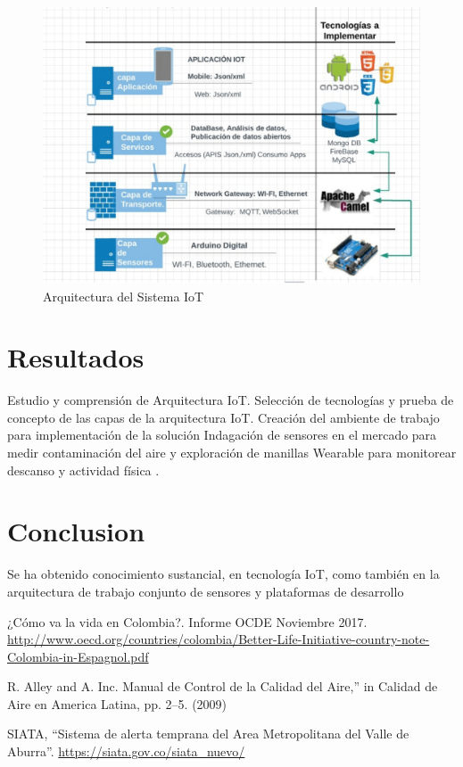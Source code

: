 \documentclass[runningheads,a4paper]{llncs}
\begin{document}
\begin{figure}
	\centering
	\includegraphics[height=8.2cm]{arquitectura2}
	\caption{Arquitectura del Sistema IoT}
	\label{fig:arquitectura}
\end{figure}

\section{Resultados}

Estudio y comprensión de Arquitectura IoT.
Selección de tecnologías y prueba de concepto de las capas de la arquitectura IoT.
Creación del ambiente de trabajo para implementación de la solución
Indagación  de sensores en el mercado para medir contaminación del aire y exploración  de manillas Wearable para monitorear descanso y actividad física \cite{proceeding1}\textsl{}.

\section{Conclusion}

Se ha obtenido conocimiento sustancial, en tecnología IoT, como también en la arquitectura de trabajo conjunto de sensores y plataformas de desarrollo




\begin{thebibliography}{4}

¿Cómo va la vida en Colombia?. Informe OCDE Noviembre 2017.
\url{http://www.oecd.org/countries/colombia/Better-Life-Initiative-country-note-Colombia-in-Espagnol.pdf}

 R. Alley and A. Inc. Manual de Control de la Calidad del Aire,” in Calidad de Aire en America Latina, pp. 2–5. (2009)

 SIATA, “Sistema de alerta temprana del Area Metropolitana del Valle de Aburra”. \url{https://siata.gov.co/siata_nuevo/}



\end{thebibliography}
\end{document}
